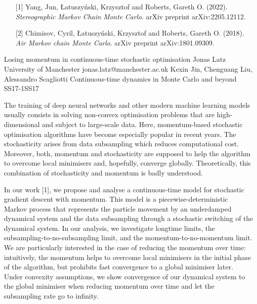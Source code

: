 \begin{talk}
\begin{enumerate}
	\item[{[1]}] Yang, Jun, {\L}atuszy{\'n}ski, Krzysztof and Roberts, Gareth O. (2022). {\it Stereographic Markov Chain Monte Carlo}. arXiv preprint arXiv:2205.12112.
	\item[{[2]}] Chimisov, Cyril, {\L}atuszy{\'n}ski, Krzysztof and Roberts, Gareth O. (2018). {\it Air Markov chain Monte Carlo}. arXiv preprint arXiv:1801.09309.
\end{enumerate}
\end{talk}

\begin{talk}
  {Losing momentum in continuous-time stochastic optimisation}%
  {Jonas Latz}%
  {University of Manchester}%
  {jonas.latz@manchester.ac.uk}%
  {Kexin Jin, Chenguang Liu, Alessandro Scagliotti}%
{Continuous-time dynamics in Monte Carlo and beyond}
{}{SS17-1}{SS17}

			
The training of deep neural networks and other modern machine learning models usually consists in solving non-convex optimisation problems that are high-dimensional and subject to large-scale data. Here, momentum-based stochastic optimisation algorithms have become especially popular in recent years. The stochasticity arises from data subsampling which reduces computational cost. Moreover, both, momentum and stochasticity are supposed to help the algorithm to overcome local minimisers and, hopefully, converge globally. Theoretically, this combination of stochasticity and momentum is badly understood.

In our work [1], we propose and analyse a continuous-time model for stochastic gradient descent with momentum. This model is a piecewise-deterministic Markov process that represents the particle movement by an underdamped dynamical system and the data subsampling through a stochastic switching of the dynamical system. In our analysis, we investigate longtime limits, the subsampling-to-no-subsampling limit, and the momentum-to-no-momentum limit. We are particularly interested in the case of reducing the momentum over time: intuitively, the momentum helps to overcome local minimisers in the initial phase of the algorithm, but prohibits fast convergence to a global minimiser later. Under convexity assumptions, we show convergence of our dynamical system to the global minimiser when reducing momentum over time and let the subsampling rate go to infinity.


\end{talk}
